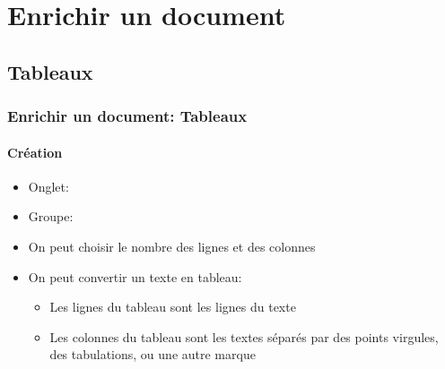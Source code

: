 \documentclass[xcolor=table]{beamer}
\begin{document}
\section{Enrichir un document}

%

\subsection{Tableaux}


\begin{frame}
\frametitle{Enrichir un document: Tableaux}
\framesubtitle{Création}

\begin{minipage}{0.70\textwidth}
\begin{itemize}
	\item Onglet: 
	\item Groupe: 
	\item On peut choisir le nombre des lignes et des colonnes
	\item On peut convertir un texte en tableau:
	\begin{itemize}
		\item Les lignes du tableau sont les lignes du texte
		\item Les colonnes du tableau sont les textes séparés par des points virgules, des tabulations, ou une autre marque
	\end{itemize}
\end{itemize}
\end{minipage}
\begin{minipage}{0.28\textwidth}	
\end{minipage}

\end{frame}
\end{document}
